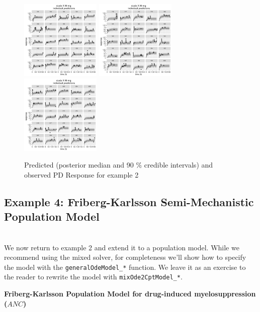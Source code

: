 \documentclass[11pt]{amsart}
\begin{document}
\begin{figure}[htbp]
\includegraphics[width=1.5in,trim=0in 0in 0 0in]{graphics/effCptModelTorsten_0.82/effCptPlots028.pdf}
\includegraphics[width=1.5in,trim=0in 0in 0 0in]{graphics/effCptModelTorsten_0.82/effCptPlots029.pdf}
\includegraphics[width=1.5in,trim=0in 0in 0 0in]{graphics/effCptModelTorsten_0.82/effCptPlots030.pdf}
\caption{{Predicted (posterior median and 90 \% credible intervals) and observed PD Response for example 2}}
\label{effCptModelPredictionsPD}
\end{figure}

\clearpage

\subsection{Example 4: Friberg-Karlsson Semi-Mechanistic Population Model} \ \\ 

We now return to example 2 and extend it to a population model. While we recommend using the mixed solver, for completeness we'll show how to specify the model with the \texttt{generalOdeModel\_*} function. We leave it as an exercise to the reader to rewrite the model with \texttt{mixOde2CptModel\_*}. 

{\bf Friberg-Karlsson Population Model for drug-induced myelosuppression ($ANC$)}
\end{document}
